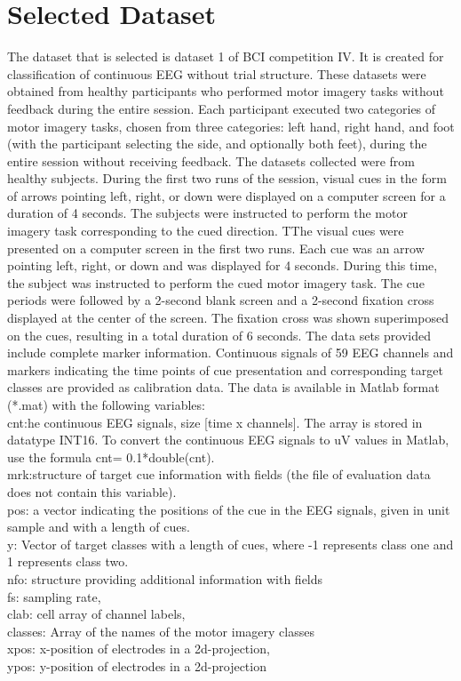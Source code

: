 \documentclass[12pt,a4paper]{report}
\begin{document}
\section{Selected Dataset}
\justify The dataset that is selected is dataset 1 of BCI competition IV. It is created for classification of continuous EEG without trial structure.
\justify These datasets were obtained from healthy participants who performed motor imagery tasks without feedback during the entire session. Each participant executed two categories of motor imagery tasks, chosen from three categories: left hand, right hand, and foot (with the participant selecting the side, and optionally both feet), during the entire session without receiving feedback. The datasets collected were from healthy subjects.
\justify During the first two runs of the session, visual cues in the form of arrows pointing left, right, or down were displayed on a computer screen for a duration of 4 seconds. The subjects were instructed to perform the motor imagery task corresponding to the cued direction. TThe visual cues were presented on a computer screen in the first two runs. Each cue was an arrow pointing left, right, or down and was displayed for 4 seconds. During this time, the subject was instructed to perform the cued motor imagery task. The cue periods were followed by a 2-second blank screen and a 2-second fixation cross displayed at the center of the screen. The fixation cross was shown superimposed on the cues, resulting in a total duration of 6 seconds. The data sets provided include complete marker information.
\justify
Continuous signals of 59 EEG channels and markers indicating the time points of cue presentation and corresponding target classes are provided as calibration data. The data is available in Matlab format (*.mat) with the following variables:
\\cnt:he continuous EEG signals, size [time x channels]. The array is stored in datatype INT16. To convert the continuous EEG signals to uV values in Matlab, use the formula cnt= 0.1*double(cnt).
\\mrk:structure of target cue information with fields (the file of evaluation data does not contain this variable).
\\pos:  a vector indicating the positions of the cue in the EEG signals, given in unit sample and with a length of cues.
\\y: Vector of target classes with a length of cues, where -1 represents class one and 1 represents class two.
\\nfo: structure providing additional information with fields
\\fs: sampling rate,
\\clab: cell array of channel labels,
\\classes: Array of the names of the motor imagery classes
\\xpos: x-position of electrodes in a 2d-projection,
\\ypos: y-position of electrodes in a 2d-projection
\end{document}
